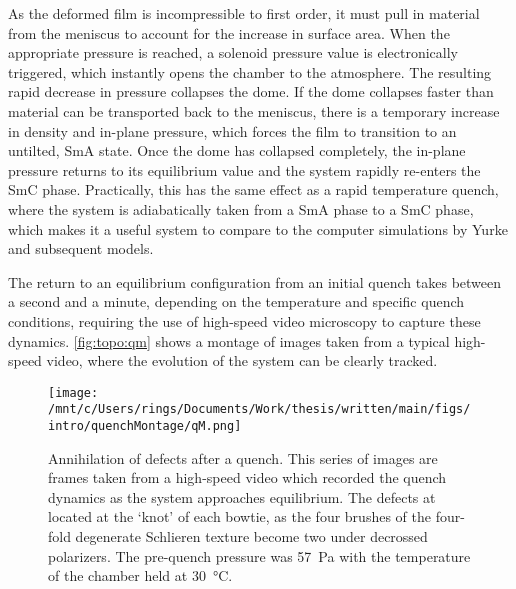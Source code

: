 \documentclass[superscriptaddress,floatfix,draft,prl]{revtex4-1}
\begin{document}
As the deformed film is incompressible to first order, it must pull in material from the meniscus to account for the
increase in surface area. When the appropriate pressure is reached, a solenoid
pressure value is electronically triggered, which instantly opens the chamber to the
atmosphere. The resulting rapid decrease in pressure collapses the dome. If the
dome collapses faster than material can be transported back to the meniscus,
there is a temporary increase in density and in-plane pressure, which forces the film to transition to
an untilted, SmA state. Once the dome has collapsed completely, the in-plane
pressure returns to its equilibrium value and the system rapidly re-enters the
SmC phase. Practically, this has the same effect as a rapid temperature quench,
where the system is adiabatically taken from a SmA phase to a SmC phase, which makes it a useful system to compare to
the computer simulations by Yurke and subsequent models. 

The return to an equilibrium configuration from an initial quench takes between
a
second and a minute, depending on the temperature and specific quench conditions,
requiring the use of high-speed video microscopy to capture these dynamics.
\autoref{fig:topo:qm} shows a montage of images taken from a typical
high-speed video, where the evolution of the system can be clearly tracked.
\begin{figure}[h!]
    \centering
    \texttt{[image: /mnt/c/Users/rings/Documents/Work/thesis/written/main/figs/intro/quenchMontage/qM.png]}
    \caption[Montage of still frames from mechanically quenched film (material
    PM2) viewed
    under reflection.]{\label{fig:topo:qm}Annihilation of defects after a quench. This
        series of images are frames taken from a high-speed video which recorded
        the quench dynamics as the system approaches equilibrium. The defects at
        located at the `knot' of each bowtie, as the four brushes of the
        four-fold degenerate Schlieren texture become two under decrossed polarizers. The pre-quench
        pressure was \SI{57}{\pascal} with the temperature of the chamber held
    at \SI{30}{\degreeCelsius}.}
    \end{figure}
\end{document}
